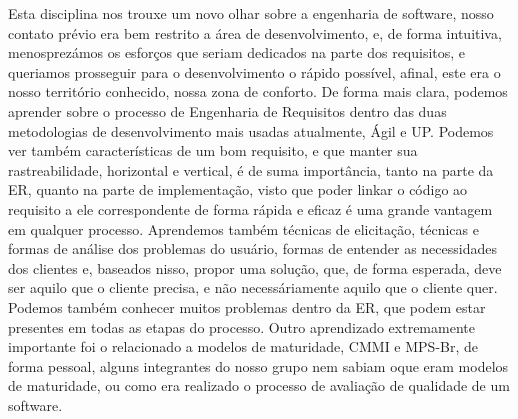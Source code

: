 Esta disciplina nos trouxe um novo olhar sobre a engenharia de software,
nosso contato prévio era bem restrito a área de desenvolvimento, e, de forma intuitiva, menosprezámos os esforços
que seriam dedicados na parte dos requisitos, e queriamos prosseguir para o desenvolvimento o rápido possível,
afinal, este era o nosso território conhecido, nossa zona de conforto.
De forma mais clara, podemos aprender sobre o processo de Engenharia de Requisitos dentro das duas metodologias
de desenvolvimento mais usadas atualmente, Ágil e UP.
Podemos ver também características de um bom requisito, e que manter sua rastreabilidade, horizontal e vertical,
é de suma importância, tanto na parte da ER, quanto na parte de implementação, visto que poder linkar o código
ao requisito a ele correspondente de forma rápida e eficaz é uma grande vantagem em qualquer processo.
Aprendemos também técnicas de elicitação, técnicas e formas de análise dos problemas do usuário,
formas de entender as necessidades dos clientes e, baseados nisso, propor uma solução, que, de forma esperada,
deve ser aquilo que o cliente precisa, e não necessáriamente aquilo que o cliente quer.
Podemos também conhecer muitos problemas dentro da ER, que podem estar presentes em todas as etapas do processo.
Outro aprendizado extremamente importante foi o relacionado a modelos de maturidade, CMMI e MPS-Br, de forma pessoal,
alguns integrantes do nosso grupo nem sabiam oque eram modelos de maturidade, ou como era realizado o processo de
avaliação de qualidade de um software.
